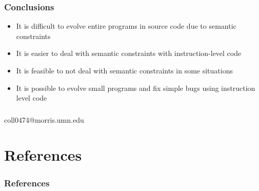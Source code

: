 \documentclass{beamer}
\newcommand{\linespace}{\vskip 0.25cm}
\begin{document}
\begin{frame}
\frametitle{Conclusions}
\begin{itemize}
\item It is difficult to evolve entire programs in source code due to semantic constraints
\item It is easier to deal with semantic constraints with instruction-level code
\item It is feasible to not deal with semantic constraints in some situations
\item It is possible to evolve small programs and fix simple bugs using instruction level code

\end{itemize}

\end{frame}


\begin{frame}
\frametitle{}
{
\cite{FINCH:2011}
\cite{Assembly:2010}
}
\begin{center}
coll0474@morris.umn.edu
\\
\linespace
\linespace
{}
\end{center}

\end{frame}




\section*{References}

\begin{frame} 
	\frametitle{References} 
	
	
\end{frame} 
\end{document}
